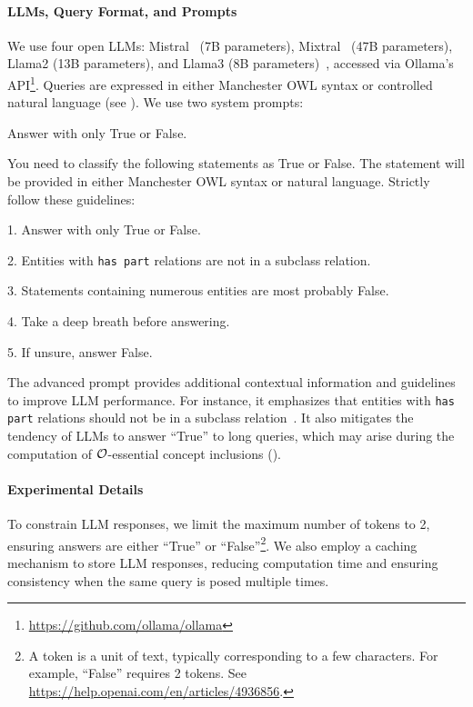 \paragraph{LLMs, Query Format, and Prompts}
We use four open \glspl{LLM}: Mistral~\cite{mistral} (7B parameters), Mixtral~\cite{mixtral} (47B parameters), Llama2 (13B parameters), and Llama3 (8B parameters)~\cite{llama2}, accessed via Ollama's API\footnote{\url{https://github.com/ollama/ollama}}.
%
Queries are expressed in either Manchester OWL syntax or controlled natural language (see ).
%
We use two system prompts:
%
\begin{promptbox}
    \scriptsize
    Answer with only True or False.
\end{promptbox}
%
\begin{promptbox}
    \scriptsize
    You need to classify the following statements as True or False. The statement will be provided in either Manchester OWL syntax or natural language. Strictly follow these guidelines:

    1. Answer with only True or False.

    2. Entities with \texttt{has part} relations are not in a subclass relation.

    3. Statements containing numerous entities are most probably False.

    4. Take a deep breath before answering.

    5. If unsure, answer False.
\end{promptbox}
%
The advanced prompt provides additional contextual information and guidelines to improve \gls{LLM} performance.
%
For instance, it emphasizes that entities with \texttt{has part} relations should not be in a subclass relation~\cite{DBLP:conf/kbclm/2023}.
%
It also mitigates the tendency of \glspl{LLM} to answer ``True'' to long queries, which may arise during the computation of \(\mathcal{O}\)-essential concept inclusions ().
%

\paragraph{Experimental Details}
To constrain \gls{LLM} responses, we limit the maximum number of tokens to 2, ensuring answers are either ``True'' or ``False''\footnote{A token is a unit of text, typically corresponding to a few characters. For example, ``False'' requires 2 tokens. See \url{https://help.openai.com/en/articles/4936856}.}.
%
We also employ a caching mechanism to store \gls{LLM} responses, reducing computation time and ensuring consistency when the same query is posed multiple times.
%